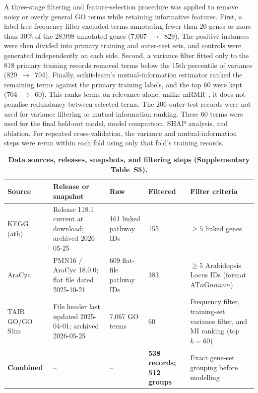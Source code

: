 \documentclass[12pt,twoside]{article}
\begin{document}
A three-stage filtering and feature-selection procedure was applied to remove noisy or overly general GO terms while retaining informative features. First, a label-free frequency filter excluded terms annotating fewer than 20 genes or more than 30\% of the 28,998 annotated genes (7,067~$\rightarrow$~829). The positive instances were then divided into primary training and outer-test sets, and controls were generated independently on each side. Second, a variance filter fitted only to the 818 primary training records removed terms below the 15th percentile of variance (829~$\rightarrow$~704). Finally, scikit-learn's mutual-information estimator \citep{pedregosa2011scikit} ranked the remaining terms against the primary training labels, and the top 60 were kept (704~$\rightarrow$~60). This ranks terms on relevance alone; unlike mRMR~\citep{dingpeng2003}, it does not penalise redundancy between selected terms. The 206 outer-test records were not used for variance filtering or mutual-information ranking. These 60 terms were used for the final held-out model, model comparison, SHAP analysis, and ablation. For repeated cross-validation, the variance and mutual-information steps were rerun within each fold using only that fold's training records.



\begin{table}[H]
\centering
\caption{\textbf{Data sources, releases, snapshots, and filtering steps
(Supplementary Table~S5).}}
\label{tab:s5_data}
\renewcommand{\arraystretch}{1.18}
\small
\begin{tabularx}{\textwidth}{L{2.2cm}L{3.0cm}L{2.4cm}L{1.6cm}X}
\toprule
\textbf{Source} & \textbf{Release or snapshot} & \textbf{Raw} & \textbf{Filtered} & \textbf{Filter criteria} \\
\midrule
KEGG (ath)   & Release 118.1 current at download; archived 2026-05-25 & 161 linked pathway IDs & 155 & $\geq5$ linked genes \\
AraCyc       & PMN16 / AraCyc 18.0.0; flat file dated 2025-10-21 & 609 flat-file pathway IDs & 383 & $\geq5$ Arabidopsis Locus IDs (format AT$n$G$nnnnn$) \\
TAIR GO/GO Slim & File header last updated 2025-04-01; archived 2026-05-25 & 7,067 GO terms & 60 & Frequency filter, training-set variance filter, and MI ranking (top $k=60$) \\
\midrule
\textbf{Combined} & -- & -- & \textbf{538 records; 512 groups} & Exact gene-set grouping before modelling \\
\bottomrule
\end{tabularx}
\end{table}
\end{document}
